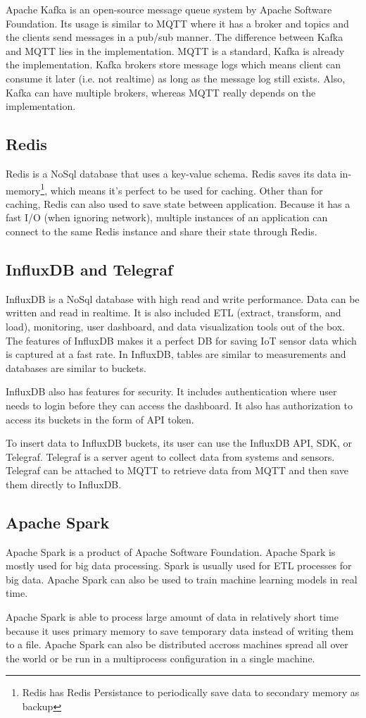 Apache Kafka is an open-source message queue system by Apache Software
Foundation. Its usage is similar to MQTT where it has a broker and topics and
the clients send messages in a pub/sub manner. The difference between Kafka and
MQTT lies in the implementation. MQTT is a standard, Kafka is already
the implementation. Kafka brokers store message logs which means client can
consume it later (i.e. not realtime) as long as the message log still exists.
Also, Kafka can have multiple brokers, whereas MQTT really depends on the
implementation.

\subsection{Redis}

Redis is a NoSql database that uses a key-value schema. Redis saves its data
in-memory\footnote{Redis has Redis Persistance to periodically save data to
	secondary memory as backup}, which means it's perfect to be used for
caching. Other than for caching, Redis can also used to save state between
application. Because it has a fast I/O (when ignoring network), multiple
instances of an application can connect to the same Redis instance and share
their state through Redis.

\subsection{InfluxDB and Telegraf}

InfluxDB is a NoSql database with high read and write performance. Data can be
written and read in realtime. It is also included ETL (extract, transform, and
load), monitoring, user dashboard, and data visualization tools out of the box.
The features of InfluxDB makes it a perfect DB for saving IoT sensor data which
is captured at a fast rate. In InfluxDB, tables are similar to measurements and
databases are similar to buckets.

InfluxDB also has features for security. It includes authentication where user
needs to login before they can access the dashboard. It also has authorization
to access its buckets in the form of API token.

To insert data to InfluxDB buckets, its user can use the InfluxDB API, SDK, or
Telegraf. Telegraf is a server agent to collect data from systems and sensors.
Telegraf can be attached to MQTT to retrieve data from MQTT and then save them
directly to InfluxDB.

\subsection{Apache Spark}

Apache Spark is a product of Apache Software Foundation. Apache Spark is mostly
used for big data processing. Spark is usually used for ETL processes for big
data. Apache Spark can also be used to train machine learning models in real
time.

Apache Spark is able to process large amount of data in relatively short time
because it uses primary memory to save temporary data instead of writing them to
a file. Apache Spark can also be distributed accross machines spread all over
the world or be run in a multiprocess configuration in a single machine.